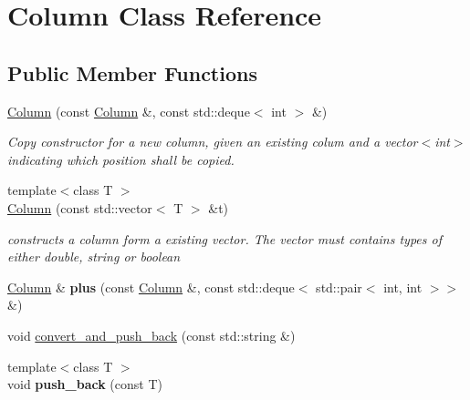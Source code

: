 \hypertarget{classColumn}{}\section{Column Class Reference}
\label{classColumn}
\subsection*{Public Member Functions}
\begin{DoxyCompactItemize}
\item 
\mbox{\label{classColumn_a30a8c38e6e84788f58541d3a2ee1d686}} 
\hyperlink{classColumn_a30a8c38e6e84788f58541d3a2ee1d686}{Column} (const \hyperlink{classColumn}{Column} \&, const std\+::deque$<$ int $>$ \&)
\begin{DoxyCompactList}\small\item\em Copy constructor for a new column, given an existing colum and a vector$<$int$>$ indicating which position shall be copied. \end{DoxyCompactList}\item 
\mbox{\label{classColumn_ab9bd37fa800223b400c0a1158ca244e1}} 
{\footnotesize template$<$class T $>$ }\\\hyperlink{classColumn_ab9bd37fa800223b400c0a1158ca244e1}{Column} (const std\+::vector$<$ T $>$ \&t)
\begin{DoxyCompactList}\small\item\em constructs a column form a existing vector. The vector must contains types of either double, string or boolean \end{DoxyCompactList}\item 
\mbox{\label{classColumn_a0520f2439432e39147de6f4779af018b}} 
\hyperlink{classColumn}{Column} \& {\bfseries plus} (const \hyperlink{classColumn}{Column} \&, const std\+::deque$<$ std\+::pair$<$ int, int $>$$>$ \&)
\item 
void \hyperlink{classColumn_a9a318e80a0581ab65f1ec81499064bc4}{convert\+\_\+and\+\_\+push\+\_\+back} (const std\+::string \&)
\item 
\mbox{\label{classColumn_a9f7b60a5645dd0b604922ad10f0a4528}} 
{\footnotesize template$<$class T $>$ }\\void {\bfseries push\+\_\+back} (const T)
\item 
$$
\end{DoxyCompactItemize}
